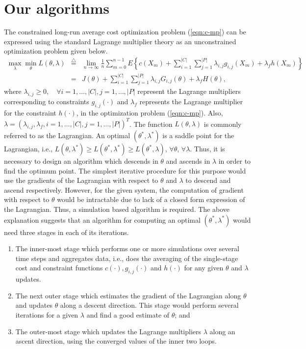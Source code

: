 \documentclass[11pt,letterpaper,english]{article}
\begin{document}
\section{Our algorithms}
\label{sec:algorithm}
The constrained long-run average cost optimization problem
(\ref{eqn:c-mp}) can be expressed using the standard Lagrange
multiplier theory as an unconstrained optimization problem given
below.
\begin{eqnarray}
\nonumber
\max_{\lambda} \min_{\theta} L(\theta, \lambda) &\stackrel{\triangle}{=}& \lim_{n \rightarrow \infty}\frac{1}{n} \sum_{m=0}^{n-1} E\left \{ c(X_m) + \sum\limits_{i = 1}^{|C|} \sum\limits_{j = 1}^{|P|}\lambda_{i,j} g_{i,j}(X_m) + \lambda_f h(X_m) \right \}\\
\label{eqn:Lagrangian}
&=& J(\theta) + \sum\limits_{i = 1}^{|C|} \sum\limits_{j = 1}^{|P|}\lambda_{i,j} G_{i,j}(\theta)
+ \lambda_f H(\theta),
\end{eqnarray}
where $\lambda_{i,j} \ge 0, \quad \forall i=1,\ldots,|C|,
j=1,\ldots,|P|$ represent the Lagrange multipliers corresponding to
constraints $g_{i,j}(\cdot)$ and $\lambda_f$ represents the Lagrange
multiplier for the constraint $h(\cdot)$, in the optimization problem
(\ref{eqn:c-mp}). Also, $\lambda = (\lambda_{i,j}, \lambda_f,
i=1,\ldots,|C|, j=1,\ldots,|P|)^T$. The function $L(\theta, \lambda)$
is commonly referred to as the Lagrangian. An optimal $\left (
\theta^*, \lambda^* \right )$ is a saddle point for the Lagrangian,
i.e., $L(\theta, \lambda^*) \ge L(\theta^*, \lambda^*) \ge L(\theta^*,
\lambda)$, $\forall\theta$, $\forall\lambda$. Thus, it is necessary to design an algorithm which descends
in $\theta$ and ascends in $\lambda$ in order to find the optimum point. The
simplest iterative procedure for this purpose would use the gradients
of the Lagrangian with respect to $\theta$ and $\lambda$ to descend
and ascend respectively. However, for the given system, the computation
of gradient with respect to $\theta$ would be intractable due to lack
of a closed form expression of the Lagrangian. Thus, a simulation
based algorithm is required. The above explanation suggests that an
algorithm for computing an optimal $\left ( \theta^*, \lambda^* \right
)$ would need three stages in each of its iterations.

\begin{enumerate}
 \item The inner-most stage which performs one or more simulations
   over several time steps and aggregates data, i.e., does the averaging of the single-stage cost and constraint functions $c(\cdot), g_{i,j}(\cdot)$ and $h(\cdot)$ for any given $\theta$ and $\lambda$ updates.
 \item The next outer stage which estimates the gradient of the Lagrangian along $\theta$ and updates $\theta$ along a descent direction. This stage would perform several iterations for a given $\lambda$ and find a good estimate of $\theta$; and
 \item The outer-most stage which updates the Lagrange multipliers $\lambda$ along an ascent direction, using the converged values of the inner two loops.
\end{enumerate}
\end{document}
